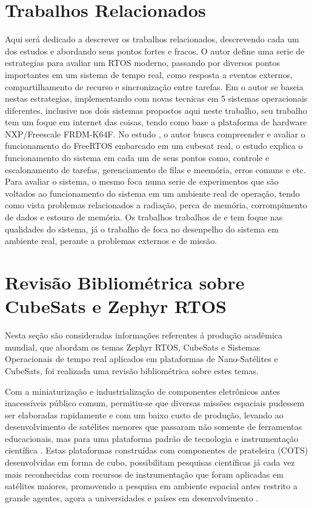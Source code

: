 

\chapter{Trabalhos Relacionados}\label{referencial_teorico}
Aqui será dedicado a descrever os trabalhos relacionados, descrevendo cada um dos estudos 
e abordando seus pontos fortes e fracos. O autor \cite{Garcia} define uma serie de estrategias 
para avaliar um RTOS moderno, passando por diversos pontos importantes em um sistema de tempo real, 
como resposta a eventos externos, compartilhamento de recurso e sincronização entre tarefas. 
Em \cite{Raymundo} o autor se baseia nestas estrategias, 
implementando com novas tecnicas em 5 sistemas operacionais diferentes, inclusive nos dois 
sistemas propostos aqui neste trabalho, seu trabalho tem um foque em internet das coisas, 
tendo como base a plataforma de hardware NXP/Freescale FRDM-K64F.
No estudo \cite{nicolas2019avaliaccao}, o autor busca compreender e avaliar o funcionamento 
do FreeRTOS embarcado em um cubesat real, o estudo explica o funcionamento do sistema em 
cada um de seus pontos como, controle e escalonamento de tarefas, gerenciamento de filas e 
meemória, erros comuns e etc. Para avaliar o sistema, o mesmo foca numa serie de experimentos 
que são voltados ao funcionamento do sistema em um ambiente real de operação, tendo como vista 
problemas relacionados a radiação, perca de memória, corrompimento de dados e estouro de memória.
Os trabalhos trabalhos de \cite{Garcia} e \cite{Raymundo} tem foque nas qualidades do sistema, já 
o trabalho de \cite{nicolas2019avaliaccao} foca no desenpelho do sistema em ambiente real, perante 
a problemas externos e de missão.

\chapter{Revisão Bibliométrica sobre CubeSats e Zephyr RTOS}\label{referencial_teorico}

Nesta seção são consideradas informações referentes á produção acadêmica mundial, que 
abordam os temas Zephyr RTOS, CubeSats e Sistemas Operacionais de tempo real aplicados 
em plataformas de Nano-Satélites e CubeSats, foi realizada uma revisão bibliométrica 
sobre estes temas. 


Com a miniaturização e industrialização de componentes eletrônicos antes inacessíveis 
público comum, permitiu-se que diversas missões espaciais pudessem ser elaboradas rapidamente 
e com um baixo custo de produção, levando ao desenvolvimento de satélites menores que passaram 
não somente de ferramentas educacionais, mas para uma plataforma padrão de tecnologia e 
instrumentação científica \cite{Selva2012}. Estas plataformas construídas com componentes de 
prateleira (COTS) desenvolvidas em forma de cubo, possibilitam pesquisas científicas já cada 
vez mais reconhecidas com recursos de instrumentação que foram aplicadas em satélites maiores, 
promovendo a pesquisa em ambiente espacial antes restrito a grande agentes, agora a 
universidades e países em desenvolvimento \cite{Woellert2011}.


